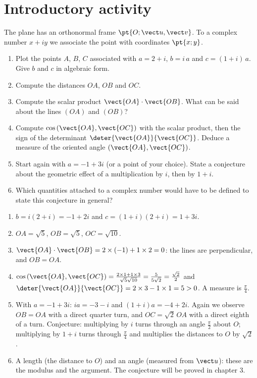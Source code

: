 \mxnewpage
\section{Introductory activity}
\begin{activity}
The plane has an orthonormal frame $\pt{O;\vect u,\vect v}$. To a complex number $x+iy$ we associate the point with coordinates $\pt{x;y}$.
\begin{enumerate}
\item Plot the points $A$, $B$, $C$ associated with $a=2+i$, $b=i\,a$ and $c=(1+i)\,a$. Give $b$ and $c$ in algebraic form.
\item Compute the distances $OA$, $OB$ and $OC$.
\item Compute the scalar product $\vect{OA}\cdot\vect{OB}$. What can be said about the lines $(OA)$ and $(OB)$?
\item Compute $\cos\left(\vect{OA},\vect{OC}\right)$ with the scalar product, then the sign of the determinant $\deter{\vect{OA}}{\vect{OC}}$. Deduce a measure of the oriented angle $\left(\vect{OA},\vect{OC}\right)$.
\item Start again with $a=-1+3i$ (or a point of your choice). State a conjecture about the geometric effect of a multiplication by $i$, then by $1+i$.
\item Which quantities attached to a complex number would have to be defined to state this conjecture in general?
\end{enumerate}
\end{activity}
\begin{solution}[Activity]
\begin{enumerate}
\item $b=i(2+i)=-1+2i$ and $c=(1+i)(2+i)=1+3i$.
\item $OA=\sqrt5$, $OB=\sqrt5$, $OC=\sqrt{10}$.
\item $\vect{OA}\cdot\vect{OB}=2\times(-1)+1\times2=0$: the lines are perpendicular, and $OB=OA$.
\item $\cos\left(\vect{OA},\vect{OC}\right)=\frac{2\times1+1\times3}{\sqrt5\sqrt{10}}=\frac{5}{5\sqrt2}=\frac{\sqrt2}2$ and $\deter{\vect{OA}}{\vect{OC}}=2\times3-1\times1=5>0$. A measure is $\frac\pi4$.
\item With $a=-1+3i$: $ia=-3-i$ and $(1+i)a=-4+2i$. Again we observe $OB=OA$ with a direct quarter turn, and $OC=\sqrt2\,OA$ with a direct eighth of a turn. Conjecture: multiplying by $i$ turns through an angle $\frac\pi2$ about $O$; multiplying by $1+i$ turns through $\frac\pi4$ and multiplies the distances to $O$ by $\sqrt2$.
\item A length (the distance to $O$) and an angle (measured from $\vect u$): these are the modulus and the argument. The conjecture will be proved in chapter 3.
\end{enumerate}
\end{solution}
